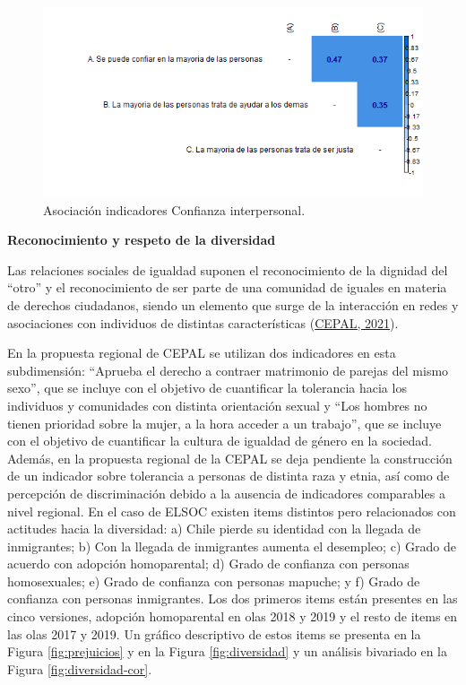 \documentclass[
  12pt,
]{book}
\begin{document}
\begin{figure}[H]

{\centering \includegraphics[width=1\linewidth,height=1\textheight]{output/graphs/confianza-interpersonal_cor} 

}

\caption{Asociación indicadores Confianza interpersonal.}\label{fig:confianza-interpersonal-cor}
\end{figure}

\textbf{Reconocimiento y respeto de la diversidad}

Las relaciones sociales de igualdad suponen el reconocimiento de la dignidad del ``otro'' y el reconocimiento de ser parte de una comunidad de iguales en materia de derechos ciudadanos, siendo un elemento que surge de la interacción en redes y asociaciones con individuos de distintas características (\protect\hyperlink{ref-cepal_cohesion_2021}{CEPAL, 2021}).

En la propuesta regional de CEPAL se utilizan dos indicadores en esta subdimensión: ``Aprueba el derecho a contraer matrimonio de parejas del mismo sexo'', que se incluye con el objetivo de cuantificar la tolerancia hacia los individuos y comunidades con distinta orientación sexual y ``Los hombres no tienen prioridad sobre la mujer, a la hora acceder a un trabajo'', que se incluye con el objetivo de cuantificar la cultura de igualdad de género en la sociedad. Además, en la propuesta regional de la CEPAL se deja pendiente la construcción de un indicador sobre tolerancia a personas de distinta raza y etnia, así como de percepción de discriminación debido a la ausencia de indicadores comparables a nivel regional. En el caso de ELSOC existen items distintos pero relacionados con actitudes hacia la diversidad: a) Chile pierde su identidad con la llegada de inmigrantes; b) Con la llegada de inmigrantes aumenta el desempleo; c) Grado de acuerdo con adopción homoparental; d) Grado de confianza con personas homosexuales; e) Grado de confianza con personas mapuche; y f) Grado de confianza con personas inmigrantes. Los dos primeros items están presentes en las cinco versiones, adopción homoparental en olas 2018 y 2019 y el resto de items en las olas 2017 y 2019. Un gráfico descriptivo de estos items se presenta en la Figura \ref{fig:prejuicios} y en la Figura \ref{fig:diversidad} y un análisis bivariado en la Figura \ref{fig:diversidad-cor}.
\end{document}
